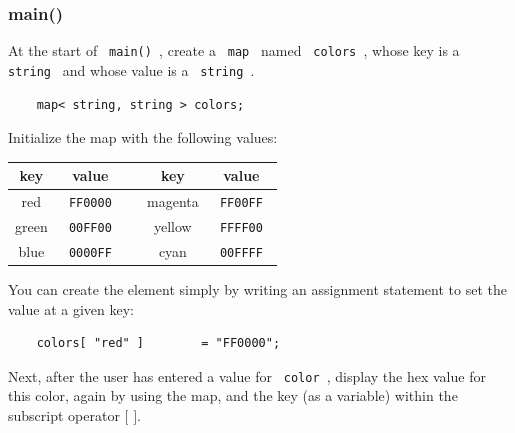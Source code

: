 \documentclass[a4paper,12pt]{book}
\begin{document}
                \hrulefill{}
                \subsubsection*{ main() }

                    At the start of \texttt{ main() }, create a
                    \texttt{ map } named \texttt{ colors },
                    whose key is a \texttt{ string }
                    and whose value is a \texttt{ string }.

\begin{verbatim}
    map< string, string > colors;
\end{verbatim}

                    Initialize the map with the following values:

                    \begin{center}
                        \begin{tabular}{ | c | c | c | c | c | }
                            \hline{}
                                \textbf{ key } &
                                \textbf{ value } & &
                                \textbf{ key } & 
                                \textbf{ value }

                            \\ \hline
                            
                            red & \texttt{ FF0000 } & & magenta & \texttt{ FF00FF }
                            \\ \hline
                            green & \texttt{ 00FF00 } & & yellow & \texttt{ FFFF00 }
                            \\ \hline
                            blue & \texttt{ 0000FF } & & cyan & \texttt{ 00FFFF }
                             \\ \hline
                            
                        \end{tabular}
                    \end{center}

                    You can create the element simply by writing an
                    assignment statement to set the value at a given key:

\begin{verbatim}
    colors[ "red" ]        = "FF0000";
\end{verbatim}

                    Next, after the user has entered a value for
                    \texttt{ color }, display the hex value for this
                    color, again by using the map, and the key
                    (as a variable) within the subscript operator $ [ $ $ ] $.
\end{document}
